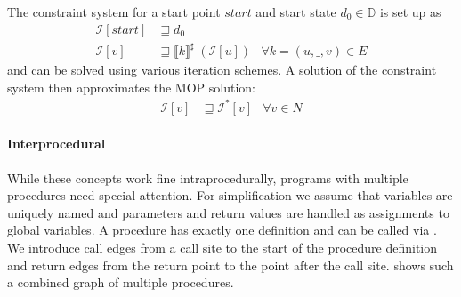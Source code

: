 The constraint system for a start point $start$ and start state $d_0 \in \mathbb{D}$ is set up as
\begin{align}
\mathcal{I}[start] &\sqsupseteq d_0\\
\mathcal{I}[v]	   &\sqsupseteq \llbracket k \rrbracket^\sharp \; (\mathcal{I}[u])	&\forall k = (u, \_, v) \in E
\end{align}
and can be solved using various iteration schemes.
A solution of the constraint system then approximates the MOP solution:
\begin{align}
\mathcal{I}[v]	   &\sqsupseteq \mathcal{I}^*[v] &\forall v \in N
\end{align}

\paragraph*{Interprocedural}
While these concepts work fine intraprocedurally, programs with multiple procedures need special attention.
For simplification we assume that variables are uniquely named and parameters and return values are handled as assignments to global variables.
A procedure  has exactly one definition  and can be called via .
We introduce call edges from a call site to the start of the procedure definition and return edges from the return point to the point after the call site.
 shows such a combined graph of multiple procedures.

